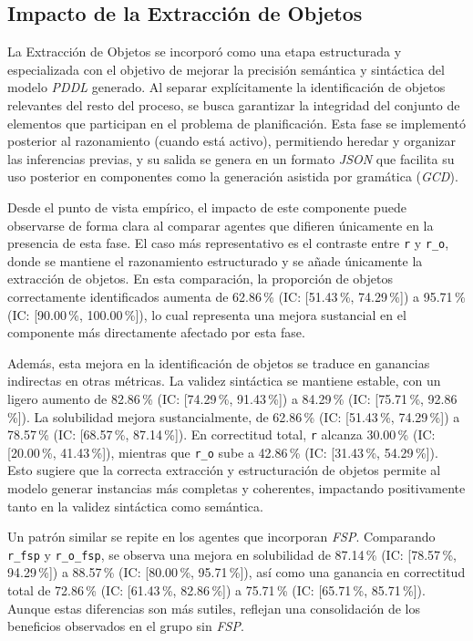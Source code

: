 \subsection{Impacto de la Extracción de Objetos}

La Extracción de Objetos se incorporó como una etapa estructurada y especializada con el objetivo de mejorar la precisión semántica y sintáctica del modelo \textit{PDDL} generado. Al separar explícitamente la identificación de objetos relevantes del resto del proceso, se busca garantizar la integridad del conjunto de elementos que participan en el problema de planificación. Esta fase se implementó posterior al razonamiento (cuando está activo), permitiendo heredar y organizar las inferencias previas, y su salida se genera en un formato \textit{JSON} que facilita su uso posterior en componentes como la generación asistida por gramática (\textit{GCD}).

Desde el punto de vista empírico, el impacto de este componente puede observarse de forma clara al comparar agentes que difieren únicamente en la presencia de esta fase. El caso más representativo es el contraste entre \texttt{r} y \texttt{r\_o}, donde se mantiene el razonamiento estructurado y se añade únicamente la extracción de objetos. En esta comparación, la proporción de objetos correctamente identificados aumenta de 62.86\,\% (IC: [51.43\,\%, 74.29\,\%]) a 95.71\,\% (IC: [90.00\,\%, 100.00\,\%]), lo cual representa una mejora sustancial en el componente más directamente afectado por esta fase.

Además, esta mejora en la identificación de objetos se traduce en ganancias indirectas en otras métricas. La validez sintáctica se mantiene estable, con un ligero aumento de 82.86\,\% (IC: [74.29\,\%, 91.43\,\%]) a 84.29\,\% (IC: [75.71\,\%, 92.86\,\%]). La solubilidad mejora sustancialmente, de 62.86\,\% (IC: [51.43\,\%, 74.29\,\%]) a 78.57\,\% (IC: [68.57\,\%, 87.14\,\%]). En correctitud total, \texttt{r} alcanza 30.00\,\% (IC: [20.00\,\%, 41.43\,\%]), mientras que \texttt{r\_o} sube a 42.86\,\% (IC: [31.43\,\%, 54.29\,\%]). Esto sugiere que la correcta extracción y estructuración de objetos permite al modelo generar instancias más completas y coherentes, impactando positivamente tanto en la validez sintáctica como semántica.

Un patrón similar se repite en los agentes que incorporan \textit{FSP}. Comparando \texttt{r\_fsp} y \texttt{r\_o\_fsp}, se observa una mejora en solubilidad de 87.14\,\% (IC: [78.57\,\%, 94.29\,\%]) a 88.57\,\% (IC: [80.00\,\%, 95.71\,\%]), así como una ganancia en correctitud total de 72.86\,\% (IC: [61.43\,\%, 82.86\,\%]) a 75.71\,\% (IC: [65.71\,\%, 85.71\,\%]). Aunque estas diferencias son más sutiles, reflejan una consolidación de los beneficios observados en el grupo sin \textit{FSP}.

